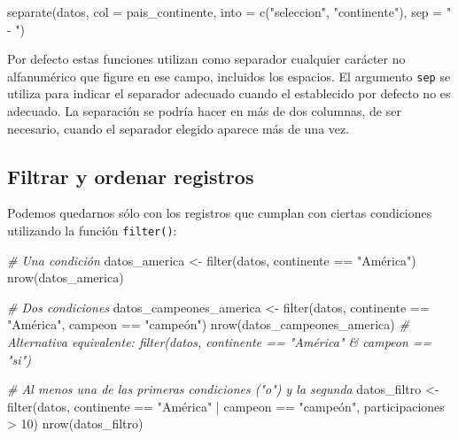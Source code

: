\documentclass[
]{book}
\newenvironment{Shaded}{\begin{snugshade}}{\end{snugshade}}
\newcommand{\AttributeTok}[1]{\textcolor[rgb]{0.77,0.63,0.00}{#1}}
\newcommand{\CommentTok}[1]{\textcolor[rgb]{0.56,0.35,0.01}{\textit{#1}}}
\newcommand{\DecValTok}[1]{\textcolor[rgb]{0.00,0.00,0.81}{#1}}
\newcommand{\FunctionTok}[1]{\textcolor[rgb]{0.00,0.00,0.00}{#1}}
\newcommand{\NormalTok}[1]{#1}
\newcommand{\OtherTok}[1]{\textcolor[rgb]{0.56,0.35,0.01}{#1}}
\newcommand{\SpecialCharTok}[1]{\textcolor[rgb]{0.00,0.00,0.00}{#1}}
\newcommand{\StringTok}[1]{\textcolor[rgb]{0.31,0.60,0.02}{#1}}
\begin{document}
\begin{Shaded}
\begin{Highlighting}[]
\FunctionTok{separate}\NormalTok{(datos, }\AttributeTok{col =}\NormalTok{ pais\_continente, }\AttributeTok{into =} \FunctionTok{c}\NormalTok{(}\StringTok{"seleccion"}\NormalTok{, }\StringTok{"continente"}\NormalTok{), }\AttributeTok{sep =} \StringTok{" {-} "}\NormalTok{)}
\end{Highlighting}
\end{Shaded}

Por defecto estas funciones utilizan como separador cualquier carácter no alfanumérico que figure en ese campo, incluidos los espacios. El argumento \texttt{sep} se utiliza para indicar el separador adecuado cuando el establecido por defecto no es adecuado. La separación se podría hacer en más de dos columnas, de ser necesario, cuando el separador elegido aparece más de una vez.

\hypertarget{filtrar-y-ordenar-registros}{%
\subsection{Filtrar y ordenar registros}\label{filtrar-y-ordenar-registros}}

Podemos quedarnos sólo con los registros que cumplan con ciertas condiciones utilizando la función \texttt{filter()}:

\begin{Shaded}
\begin{Highlighting}[]
\CommentTok{\# Una condición}
\NormalTok{datos\_america }\OtherTok{\textless{}{-}} \FunctionTok{filter}\NormalTok{(datos, continente }\SpecialCharTok{==} \StringTok{"América"}\NormalTok{)}
\FunctionTok{nrow}\NormalTok{(datos\_america)}

\CommentTok{\# Dos condiciones}
\NormalTok{datos\_campeones\_america }\OtherTok{\textless{}{-}} \FunctionTok{filter}\NormalTok{(datos, continente }\SpecialCharTok{==} \StringTok{"América"}\NormalTok{, campeon }\SpecialCharTok{==} \StringTok{"campeón"}\NormalTok{)}
\FunctionTok{nrow}\NormalTok{(datos\_campeones\_america)}
\CommentTok{\# Alternativa equivalente: filter(datos, continente == "América" \& campeon == "si")}

\CommentTok{\# Al menos una de las primeras condiciones ("o") y la segunda}
\NormalTok{datos\_filtro }\OtherTok{\textless{}{-}} \FunctionTok{filter}\NormalTok{(datos, continente }\SpecialCharTok{==} \StringTok{"América"} \SpecialCharTok{|}\NormalTok{ campeon }\SpecialCharTok{==} \StringTok{"campeón"}\NormalTok{, participaciones }\SpecialCharTok{\textgreater{}} \DecValTok{10}\NormalTok{)}
\FunctionTok{nrow}\NormalTok{(datos\_filtro)}
\end{Highlighting}
\end{Shaded}
\end{document}

